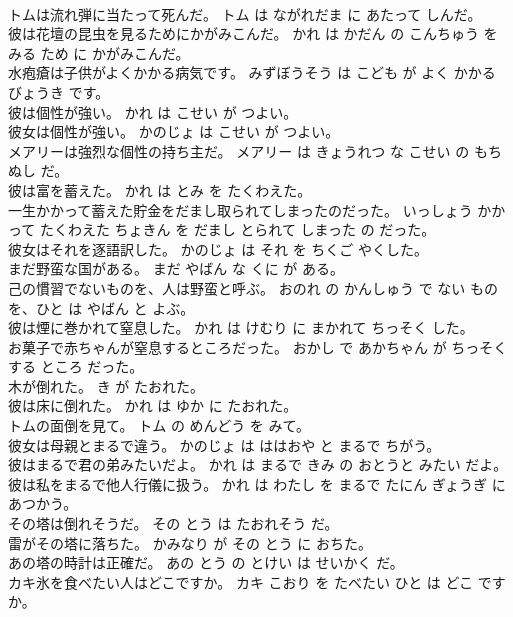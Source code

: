 \documentclass[8pt]{extreport}
\begin{document}
\begin{CJK}{UTF8}{min}
\\	トムは流れ弾に当たって死んだ。	トム は ながれだま に あたって しんだ。	
\\	彼は花壇の昆虫を見るためにかがみこんだ。	かれ は かだん の こんちゅう を みる ため に かがみこんだ。	
\\	水疱瘡は子供がよくかかる病気です。	みずぼうそう は こども が よく かかる びょうき です。	
\\	彼は個性が強い。	かれ は こせい が つよい。	
\\	彼女は個性が強い。	かのじょ は こせい が つよい。	
\\	メアリーは強烈な個性の持ち主だ。	メアリー は きょうれつ な こせい の もちぬし だ。	
\\	彼は富を蓄えた。	かれ は とみ を たくわえた。	
\\	一生かかって蓄えた貯金をだまし取られてしまったのだった。	いっしょう かかって たくわえた ちょきん を だまし とられて しまった の だった。	
\\	彼女はそれを逐語訳した。	かのじょ は それ を ちくご やくした。	
\\	まだ野蛮な国がある。	まだ やばん な くに が ある。	
\\	己の慣習でないものを、人は野蛮と呼ぶ。	おのれ の かんしゅう で ない もの を、ひと は やばん と よぶ。	
\\	彼は煙に巻かれて窒息した。	かれ は けむり に まかれて ちっそく した。	
\\	お菓子で赤ちゃんが窒息するところだった。	おかし で あかちゃん が ちっそく する ところ だった。	
\\	木が倒れた。	き が たおれた。	
\\	彼は床に倒れた。	かれ は ゆか に たおれた。	
\\	トムの面倒を見て。	トム の めんどう を みて。	
\\	彼女は母親とまるで違う。	かのじょ は ははおや と まるで ちがう。	
\\	彼はまるで君の弟みたいだよ。	かれ は まるで きみ の おとうと みたい だよ。	
\\	彼は私をまるで他人行儀に扱う。	かれ は わたし を まるで たにん ぎょうぎ に あつかう。	
\\	その塔は倒れそうだ。	その とう は たおれそう だ。	
\\	雷がその塔に落ちた。	かみなり が その とう に おちた。	
\\	あの塔の時計は正確だ。	あの とう の とけい は せいかく だ。	
\\	カキ氷を食べたい人はどこですか。	カキ こおり を たべたい ひと は どこ です か。	

\end{CJK}
\end{document}
